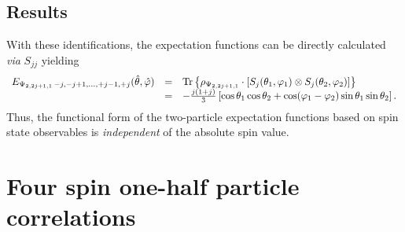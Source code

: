 \documentclass[pra,amsfonts,showpacs,showkeys,preprint]{revtex4}
\begin{document}
\subsection{Results}




With these identifications, the expectation functions can be directly calculated {\it via} $S_{jj}$ yielding
\begin{equation}
\begin{array}{rcl}
E_{{ \Psi_{2,2j+1,1}}\,-j,-j+1,\ldots,+j-1, +j } ({\hat \theta},{\hat \varphi} )
&=&
{\rm Tr}\left\{ \rho_{ \Psi_{2,2j+1,1}} \cdot \left[ S_{j}(\theta_1,\varphi_1) \otimes S_{j}(\theta_2,\varphi_2)\right]\right\} \\
&=& -\frac{j(1+j)}{3} \left[\cos \theta_1 \cos \theta_2 + \cos (\varphi_1 - \varphi_2) \sin \theta_1 \sin \theta_2\right]  .
\end{array}
\label{2009-gtq-edosgcjj}
\end{equation}
Thus, the functional form of the two-particle expectation functions based on spin state observables is {\em
independent} of the absolute spin value.






\section{Four spin one-half particle correlations}
\end{document}
